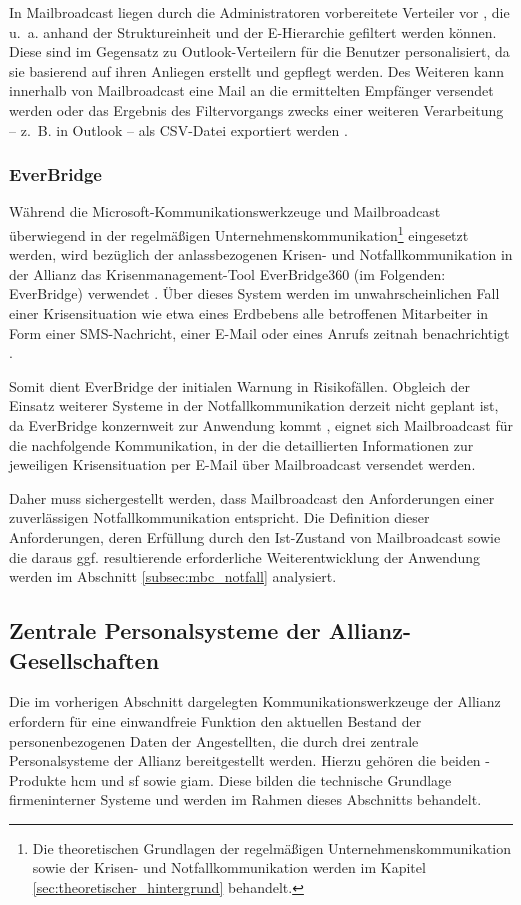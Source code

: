 In Mailbroadcast liegen durch die Administratoren vorbereitete Verteiler vor \cite{mbc2020}, die u.~a. anhand der Struktureinheit und der E-Hierarchie
gefiltert werden können. Diese sind im Gegensatz zu Outlook-Verteilern für die Benutzer personalisiert, da sie basierend auf ihren Anliegen erstellt und
gepflegt werden. Des Weiteren kann innerhalb von Mailbroadcast eine Mail an die ermittelten Empfänger versendet werden oder das Ergebnis des Filtervorgangs
zwecks einer weiteren Verarbeitung -- z.~B. in Outlook -- als CSV-Datei exportiert werden \cite{mbc2021}.

\subsubsection{EverBridge}
Während die Microsoft-Kommunikationswerkzeuge und Mailbroadcast überwiegend in der regelmäßigen Unternehmenskommunikation\footnote{Die theoretischen
Grundlagen der regelmäßigen Unternehmenskommunikation sowie der Krisen- und Notfallkommunikation werden im Kapitel \ref{sec:theoretischer_hintergrund}
behandelt.} eingesetzt werden, wird bezüglich der anlassbezogenen Krisen- und Notfallkommunikation in der Allianz das Kri\-sen\-ma\-nagement-Tool EverBridge360
(im Folgenden: EverBridge) verwendet \cite{everbridgeInAllianz}. Über dieses System werden im unwahrscheinlichen Fall einer Krisensituation wie etwa eines
Erdbebens alle betroffenen Mitarbeiter in Form einer SMS-Nachricht, einer E-Mail oder eines Anrufs zeitnah benachrichtigt \cite{everbridgeInAllianz}.

Somit dient EverBridge der initialen Warnung in Risikofällen. Obgleich der Einsatz weiterer Systeme in der Notfallkommunikation derzeit nicht
geplant ist, da EverBridge konzernweit zur Anwendung kommt \cite{everbridgeInAllianz}, eignet sich Mailbroadcast für die nachfolgende Kommunikation,
in der die detaillierten Informationen zur jeweiligen Krisensituation per E-Mail über Mailbroadcast versendet werden.

Daher muss sichergestellt werden, dass Mailbroadcast den Anforderungen einer zuverlässigen Notfallkommunikation entspricht. Die Definition dieser
Anforderungen, deren Erfüllung durch den Ist-Zustand von Mailbroadcast sowie die daraus ggf. resultierende erforderliche Weiterentwicklung der
Anwendung werden im Abschnitt \ref{subsec:mbc_notfall} analysiert. %

\subsection{Zentrale Personalsysteme der Allianz-Gesellschaften}
Die im vorherigen Abschnitt dargelegten Kommunikationswerkzeuge der Allianz erfordern für eine einwandfreie Funktion den aktuellen Bestand der personenbezogenen
Daten der Angestellten, die durch drei zentrale Personalsysteme der Allianz bereitgestellt werden. Hierzu gehören die beiden -Produkte \gls{hcm} und \gls{sf} sowie \gls{giam}. Diese bilden die technische Grundlage firmeninterner Systeme und
werden im Rahmen dieses Abschnitts behandelt.


